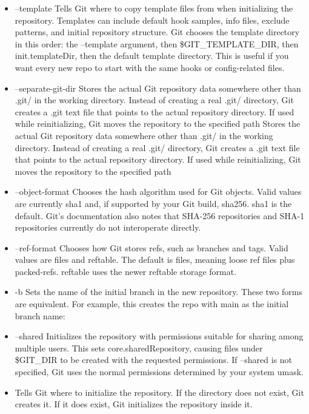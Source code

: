 \documentclass{report}
\begin{document}
\begin{itemize}
\begin{itemize}
                \item --template Tells Git where to copy template files from when initializing the repository. Templates can include default hook samples, info files, exclude patterns, and initial repository structure. Git chooses the template directory in this order: the --template argument, then \$GIT\_TEMPLATE\_DIR, then init.templateDir, then the default template directory.
                    \bigbreak \noindent 
                    This is useful if you want every new repo to start with the same hooks or config-related files.
                \item --separate-git-dir Stores the actual Git repository data somewhere other than .git/ in the working directory. Instead of creating a real .git/ directory, Git creates a .git text file that points to the actual repository directory. If used while reinitializing, Git moves the repository to the specified path
                    \bigbreak \noindent 
                    Stores the actual Git repository data somewhere other than .git/ in the working directory. Instead of creating a real .git/ directory, Git creates a .git text file that points to the actual repository directory. If used while reinitializing, Git moves the repository to the specified path
                \item --object-format Chooses the hash algorithm used for Git objects. Valid values are currently sha1 and, if supported by your Git build, sha256. sha1 is the default. Git’s documentation also notes that SHA-256 repositories and SHA-1 repositories currently do not interoperate directly.
                \item --ref-format Chooses how Git stores refs, such as branches and tags. Valid values are files and reftable. The default is files, meaning loose ref files plus packed-refs. reftable uses the newer reftable storage format.
                \item -b Sets the name of the initial branch in the new repository. These two forms are equivalent. For example, this creates the repo with main as the initial branch name:
                \item --shared Initializes the repository with permissions suitable for sharing among multiple users. This sets core.sharedRepository, causing files under \$GIT\_DIR to be created with the requested permissions. If --shared is not specified, Git uses the normal permissions determined by your system umask.
                \item Tells Git where to initialize the repository. If the directory does not exist, Git creates it. If it does exist, Git initializes the repository inside it.

\end{itemize}
\end{itemize}
\end{document}
